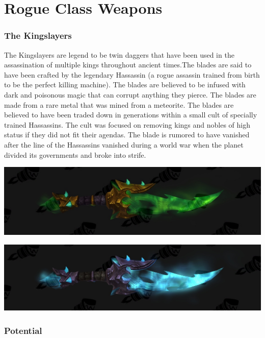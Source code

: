 \section{Rogue Class Weapons}

\subsubsection{The Kingslayers}

The Kingslayers are legend to be twin daggers that have been used in the assassination of multiple kings throughout ancient times.The blades are said to have been crafted by the legendary Hassassin (a rogue assassin trained from birth to be the perfect killing machine). The blades are believed to be infused with dark and poisonous magic that can corrupt anything they pierce. The blades are made from a rare metal that was mined from a meteorite. The blades are believed to have been traded down in generations within a small cult of specially trained Hassassins. The cult was focused on removing kings and nobles of high status if they did not fit their agendas. The blade is rumored to have vanished after the line of the Hassassins vanished during a world war when the planet divided its governments and broke into strife.

\begin{center}
	\includegraphics[width=\linewidth]{img/weapons/kingslayer-green.jpg}
	
	\includegraphics[width=\linewidth]{img/weapons/kingslayer-blue.jpg}
\end{center}

\subsubsection{Potential}

